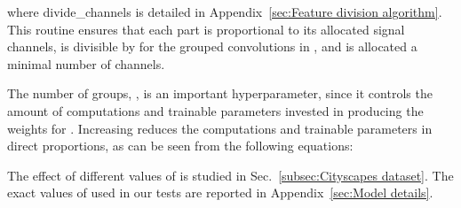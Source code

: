 \documentclass[final]{cvpr}
\begin{document}
where divide\_channels is detailed in Appendix~\ref{sec:Feature division algorithm}. This routine ensures that each part is proportional to its allocated signal channels, is divisible by  for the grouped convolutions in , and is allocated a minimal number of channels.




The number of groups, , is an important hyperparameter, since it controls the amount of computations and trainable parameters invested in producing the weights for . Increasing  reduces the computations and trainable parameters in direct proportions, as can be seen from the following equations:

The effect of different values of  is studied in Sec.~\ref{subsec:Cityscapes dataset}.
The exact values of  used in our tests are reported in Appendix~\ref{sec:Model details}. 
\end{document}
